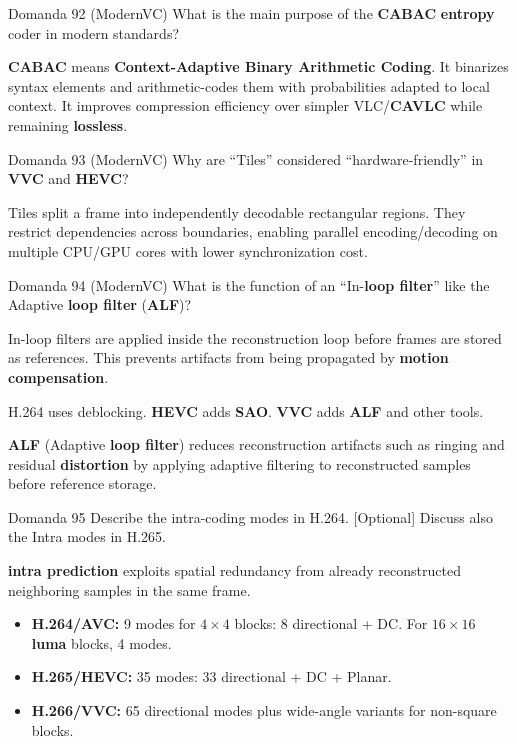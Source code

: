 \begin{questionbox}{Domanda 92}
(ModernVC) What is the main purpose of the \textbf{CABAC} \textbf{entropy} coder in modern standards?
\end{questionbox}


\textbf{CABAC} means \textbf{Context-Adaptive Binary Arithmetic Coding}. It binarizes syntax elements and arithmetic-codes them with probabilities adapted to local context. It improves compression efficiency over simpler VLC/\textbf{CAVLC} while remaining \textbf{lossless}.



\begin{questionbox}{Domanda 93}
(ModernVC) Why are “Tiles” considered “hardware-friendly” in \textbf{VVC} and \textbf{HEVC}?
\end{questionbox}


Tiles split a frame into independently decodable rectangular regions. They restrict dependencies across boundaries, enabling parallel encoding/decoding on multiple CPU/GPU cores with lower synchronization cost.



\begin{questionbox}{Domanda 94}
(ModernVC) What is the function of an “In-\textbf{loop filter}” like the Adaptive \textbf{loop filter} (\textbf{ALF})?
\end{questionbox}


In-loop filters are applied inside the reconstruction loop before frames are stored as references. This prevents artifacts from being propagated by \textbf{motion compensation}.

H.264 uses deblocking. \textbf{HEVC} adds \textbf{SAO}. \textbf{VVC} adds \textbf{ALF} and other tools.

\textbf{ALF} (Adaptive \textbf{loop filter}) reduces reconstruction artifacts such as ringing and residual \textbf{distortion} by applying adaptive filtering to reconstructed samples before reference storage.



\begin{questionbox}{Domanda 95}
Describe the intra-coding modes in H.264. [Optional] Discuss also the Intra modes in H.265.
\end{questionbox}


\textbf{intra prediction} exploits spatial redundancy from already reconstructed neighboring samples in the same frame.

\begin{itemize}
  \item \textbf{H.264/AVC:} 9 modes for $4\times4$ blocks: 8 directional + DC. For $16\times16$ \textbf{luma} blocks, 4 modes.
  \item \textbf{H.265/\textbf{HEVC}:} 35 modes: 33 directional + DC + Planar.
  \item \textbf{H.266/\textbf{VVC}:} 65 directional modes plus wide-angle variants for non-square blocks.
\end{itemize}

